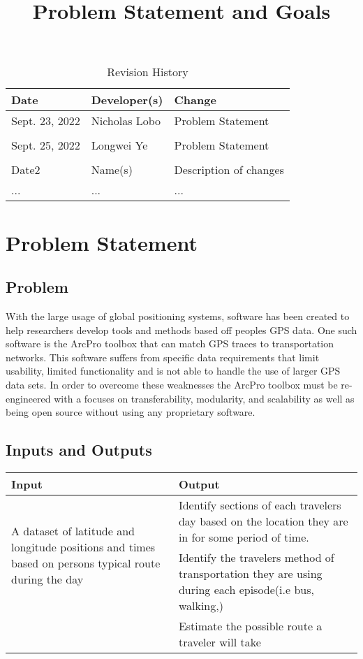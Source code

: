 \documentclass{article}
\title{Problem Statement and Goals\\\progname}
\author{\authname}
\date{}
\begin{document}
\maketitle

\begin{table}[hp]
\caption{Revision History} \label{TblRevisionHistory}
\begin{tabularx}{\textwidth}{llX}
\toprule
\textbf{Date} & \textbf{Developer(s)} & \textbf{Change}\\
\midrule
Sept. 23, 2022 & Nicholas Lobo & Problem Statement\\\\
Sept. 25, 2022 & Longwei Ye    & Problem Statement\\\\
Date2 & Name(s) & Description of changes\\
... & ... & ...\\
\bottomrule
\end{tabularx}
\end{table}

\section{Problem Statement}



\subsection{Problem}
With the large usage of global positioning systems, software has been created to help researchers develop tools and methods based off peoples GPS data. 
One such software is the ArcPro toolbox that can match GPS traces to transportation networks. This software suffers from specific data requirements that limit usability, 
limited functionality and is not able to handle the use of larger GPS data sets. In order to overcome these weaknesses the ArcPro toolbox must be re-engineered with a focuses 
on transferability, modularity, and scalability as well as being open source without using any proprietary software. 

\subsection{Inputs and Outputs}
\begin{table}[h]
    \centering
    \begin{tabular}{|p{6cm}|p{6cm}|}
    \hline
    Input & Output  \\
    \hline
    \multirow{2}{5cm}{A dataset of latitude and longitude positions and times based on persons typical route during the day} & Identify sections of each travelers day based on the location they are in for some period of time.  \\\cline{2-2} 
    & Identify the travelers method of transportation they are using during each episode(i.e bus, walking,)  \\\cline{2-2} 
    & Estimate the possible route a traveler will take\\\cline{2-2} 
    \hline
    \end{tabular}
\end{table}
\end{document}
